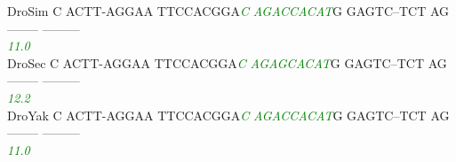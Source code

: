 \documentclass[11pt,twoside,reqno,a4paper]{article}
\begin{document}
{DroSim	C	ACTT-AGGAA	TTCCACGGA\textit{\textcolor{Green}{C}}	\textit{\textcolor{Green}{A}}\textit{\textcolor{Green}{G}}\textit{\textcolor{Green}{A}}\textit{\textcolor{Green}{C}}\textit{\textcolor{Green}{C}}\textit{\textcolor{Green}{A}}\textit{\textcolor{Green}{C}}\textit{\textcolor{Green}{A}}\textit{\textcolor{Green}{T}}G	GAGTC--TCT	AG--------	---------\\
\hspace*{7\charwidth}\hspace*{1\charwidth}\hspace*{1\charwidth}\hspace*{20\charwidth}\textit{\textcolor{Green}{11.0}}\hspace*{1\charwidth}\hspace*{1\charwidth}\hspace*{1\charwidth}\hspace*{1\charwidth}\\
DroSec	C	ACTT-AGGAA	TTCCACGGA\textit{\textcolor{Green}{C}}	\textit{\textcolor{Green}{A}}\textit{\textcolor{Green}{G}}\textit{\textcolor{Green}{A}}\textit{\textcolor{Green}{G}}\textit{\textcolor{Green}{C}}\textit{\textcolor{Green}{A}}\textit{\textcolor{Green}{C}}\textit{\textcolor{Green}{A}}\textit{\textcolor{Green}{T}}G	GAGTC--TCT	AG--------	---------\\
\hspace*{7\charwidth}\hspace*{1\charwidth}\hspace*{1\charwidth}\hspace*{20\charwidth}\textit{\textcolor{Green}{12.2}}\hspace*{1\charwidth}\hspace*{1\charwidth}\hspace*{1\charwidth}\hspace*{1\charwidth}\\
DroYak	C	ACTT-AGGAA	TTCCACGGA\textit{\textcolor{Green}{C}}	\textit{\textcolor{Green}{A}}\textit{\textcolor{Green}{G}}\textit{\textcolor{Green}{A}}\textit{\textcolor{Green}{C}}\textit{\textcolor{Green}{C}}\textit{\textcolor{Green}{A}}\textit{\textcolor{Green}{C}}\textit{\textcolor{Green}{A}}\textit{\textcolor{Green}{T}}G	GAGTC--TCT	AG--------	---------\\
\hspace*{7\charwidth}\hspace*{1\charwidth}\hspace*{1\charwidth}\hspace*{20\charwidth}\textit{\textcolor{Green}{11.0}}\hspace*{1\charwidth}\hspace*{1\charwidth}\hspace*{1\charwidth}\hspace*{1\charwidth}\\
}
\end{document}
